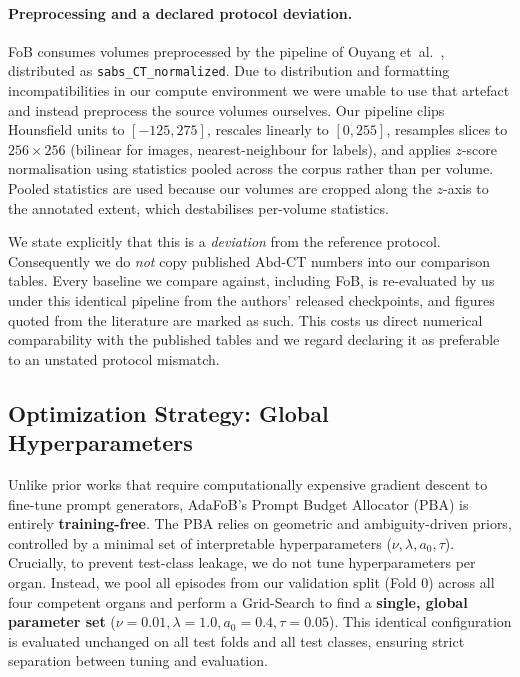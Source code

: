 \paragraph{Preprocessing and a declared protocol deviation.}
FoB consumes volumes preprocessed by the pipeline of Ouyang
et~al.~\cite{ouyang2020ssl}, distributed as \texttt{sabs\_CT\_normalized}. Due
to distribution and formatting incompatibilities in our compute environment we
were unable to use that artefact and instead preprocess the source volumes
ourselves. Our pipeline clips Hounsfield units to $[-125, 275]$, rescales
linearly to $[0,255]$, resamples slices to $256\times256$ (bilinear for images,
nearest-neighbour for labels), and applies $z$-score normalisation using
statistics pooled across the corpus rather than per volume. Pooled statistics
are used because our volumes are cropped along the $z$-axis to the annotated
extent, which destabilises per-volume statistics.

We state explicitly that this is a \emph{deviation} from the reference
protocol. Consequently we do \emph{not} copy published Abd-CT numbers into our
comparison tables. Every baseline we compare against, including FoB, is
re-evaluated by us under this identical pipeline from the authors' released
checkpoints, and figures quoted from the literature are marked as such. This
costs us direct numerical comparability with the published tables and we regard
declaring it as preferable to an unstated protocol mismatch.

\subsection{Optimization Strategy: Global Hyperparameters}
\label{subsec:training}

Unlike prior works that require computationally expensive gradient descent to
fine-tune prompt generators, AdaFoB's Prompt Budget Allocator (PBA) is entirely
\textbf{training-free}. The PBA relies on geometric and ambiguity-driven priors,
controlled by a minimal set of interpretable hyperparameters ($\nu, \lambda, a_0, \tau$).
Crucially, to prevent test-class leakage, we do not tune hyperparameters per organ.
Instead, we pool all episodes from our validation split (Fold 0) across all four
competent organs and perform a Grid-Search to find a \textbf{single, global
parameter set} ($\nu=0.01, \lambda=1.0, a_0=0.4, \tau=0.05$). This identical
configuration is evaluated unchanged on all test folds and all test classes,
ensuring strict separation between tuning and evaluation.

